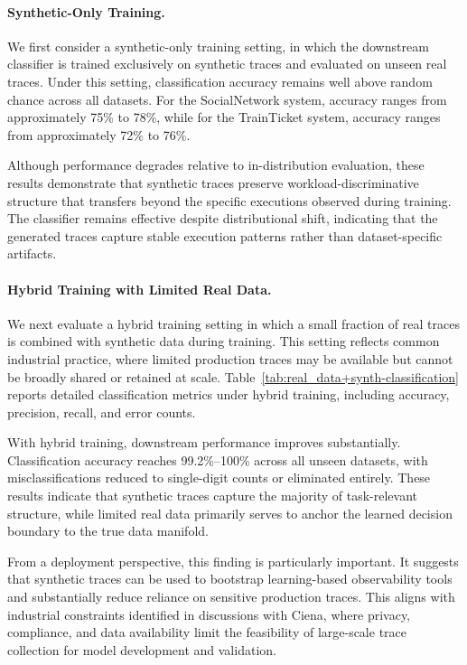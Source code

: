 \documentclass[sigconf,review]{acmart}
\begin{document}
\paragraph{Synthetic-Only Training.}
We first consider a synthetic-only training setting, in which the downstream classifier is trained exclusively on synthetic traces and evaluated on unseen real traces. Under this setting, classification accuracy remains well above random chance across all datasets. For the SocialNetwork system, accuracy ranges from approximately 75\% to 78\%, while for the TrainTicket system, accuracy ranges from approximately 72\% to 76\%.

Although performance degrades relative to in-distribution evaluation, these results demonstrate that synthetic traces preserve workload-discriminative structure that transfers beyond the specific executions observed during training. The classifier remains effective despite distributional shift, indicating that the generated traces capture stable execution patterns rather than dataset-specific artifacts.

\paragraph{Hybrid Training with Limited Real Data.}
We next evaluate a hybrid training setting in which a small fraction of real traces is combined with synthetic data during training. This setting reflects common industrial practice, where limited production traces may be available but cannot be broadly shared or retained at scale. Table~\ref{tab:real_data+synth-classification} reports detailed classification metrics under hybrid training, including accuracy, precision, recall, and error counts.



With hybrid training, downstream performance improves substantially. Classification accuracy reaches 99.2\%--100\% across all unseen datasets, with misclassifications reduced to single-digit counts or eliminated entirely. These results indicate that synthetic traces capture the majority of task-relevant structure, while limited real data primarily serves to anchor the learned decision boundary to the true data manifold.

From a deployment perspective, this finding is particularly important. It suggests that synthetic traces can be used to bootstrap learning-based observability tools and substantially reduce reliance on sensitive production traces. This aligns with industrial constraints identified in discussions with Ciena, where privacy, compliance, and data availability limit the feasibility of large-scale trace collection for model development and validation.
\end{document}
